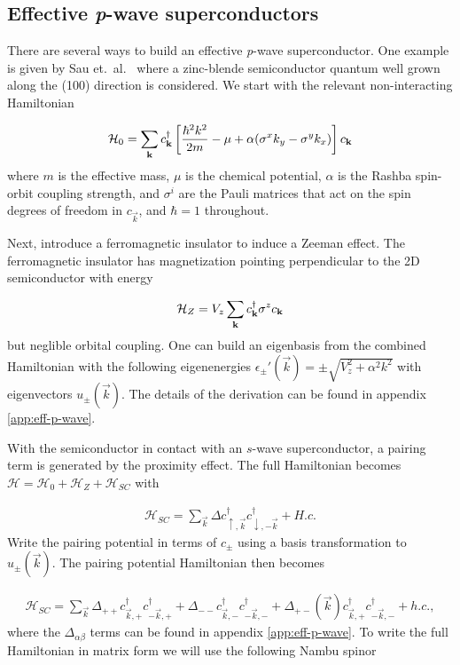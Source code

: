 \subsection{Effective \textit{p}-wave superconductors}
There are several ways to build an effective \textit{p}-wave superconductor.
One example is given by Sau et.\ al.~\cite{sauGenericNewPlatform2010} where a zinc-blende semiconductor quantum well grown along the (100) direction is considered.
We start with the relevant non-interacting Hamiltonian

\begin{equation}
  \mathcal{H}_0 = \sum_{\mathbf{k}}  c^{\dagger}_{\mathbf{k}} \left[\frac{\hbar^2 k^2}{2m} - \mu + \alpha ( \sigma^x k_y - \sigma^y k_x) \right] c_{\mathbf{k}}
\end{equation}
where $m$ is the effective mass, $\mu$ is the chemical potential, $\alpha$ is the Rashba spin-orbit coupling strength, and $\sigma^i$ are the Pauli matrices that act on the spin degrees of freedom in $c_{\vec{k}}$, and $\hbar=1$ throughout.

Next, introduce a ferromagnetic insulator to induce a Zeeman effect.
The ferromagnetic insulator has magnetization pointing perpendicular to the 2D semiconductor with energy

\begin{equation}
  \mathcal{H}_Z = V_z \sum_{\mathbf{k}} c^{\dagger}_{\mathbf{k}} \sigma^z c_{\mathbf{k}}
\end{equation}
but neglible orbital coupling.
One can build an eigenbasis from the combined Hamiltonian with the following eigenenergies $\epsilon_{\pm}'(\vec{k}) = \pm \sqrt{V_z^2+\alpha^2 k^2}$ with eigenvectors $u_{\pm}(\vec{k})$. The details of the derivation can be found in appendix \ref{app:eff-p-wave}.

With the semiconductor in contact with an $s$-wave superconductor, a pairing term is generated by the proximity effect.
The full Hamiltonian becomes $\mathcal{H} = \mathcal{H}_0 + \mathcal{H}_Z + \mathcal{H}_{SC}$ with

\begin{align}
  \mathcal{H}_{SC} = \sum_{\vec{k}} \Delta c_{\uparrow,\vec{k}}^\dagger c_{\downarrow,-\vec{k}}^\dagger + H.c.
\end{align}
Write the pairing potential in terms of $c_{\pm}$ using a basis transformation to $u_{\pm}(\vec{k})$.
The pairing potential Hamiltonian then becomes

\begin{align}
  \mathcal{H}_{SC} = \sum_{\vec{k}} \Delta_{++}c_{\vec{k},+}^{\dagger}c_{-\vec{k},+}^{\dagger} + \Delta_{- -}c_{\vec{k},-}^{\dagger}c_{-\vec{k},-}^{\dagger} +\Delta_{+-}(\vec{k})c_{\vec{k},+}^{\dagger}c_{-\vec{k},-}^{\dagger} + h.c.,
\end{align}
where the $\Delta_{\alpha \beta}$ terms can be found in appendix \ref{app:eff-p-wave}.
To write the full Hamiltonian in matrix form we will use the following Nambu spinor

